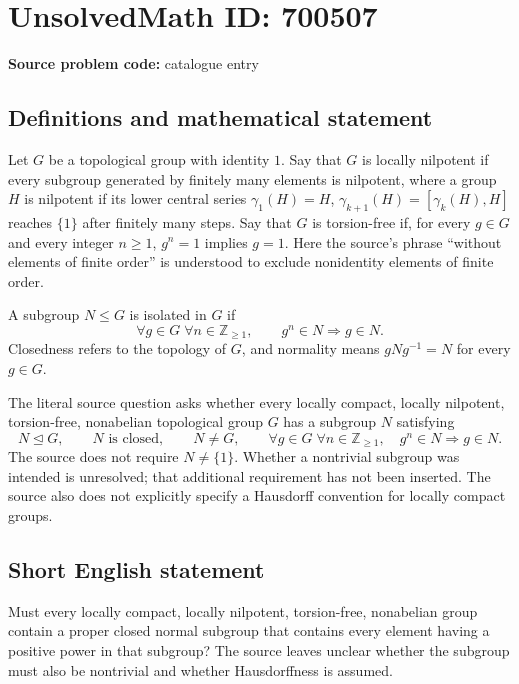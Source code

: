 \documentclass[11pt]{article}
\newcommand{\Z}{\mathbb{Z}}
\begin{document}
\section*{UnsolvedMath ID: 700507}
\textbf{Source problem code:} catalogue entry
\subsection{Definitions and mathematical statement}
Let \(G\) be a topological group with identity \(1\). Say that \(G\) is locally nilpotent if every subgroup generated by finitely many elements is nilpotent, where a group \(H\) is nilpotent if its lower central series \(\gamma_1(H)=H\), \(\gamma_{k+1}(H)=[\gamma_k(H),H]\) reaches \(\{1\}\) after finitely many steps. Say that \(G\) is torsion-free if, for every \(g\in G\) and every integer \(n\geq 1\), \(g^n=1\) implies \(g=1\). Here the source's phrase ``without elements of finite order'' is understood to exclude nonidentity elements of finite order.

A subgroup \(N\leq G\) is isolated in \(G\) if
\[
\forall g\in G\;\forall n\in\Z_{\geq 1},\qquad g^n\in N\Longrightarrow g\in N.
\]
Closedness refers to the topology of \(G\), and normality means \(gNg^{-1}=N\) for every \(g\in G\).

The literal source question asks whether every locally compact, locally nilpotent, torsion-free, nonabelian topological group \(G\) has a subgroup \(N\) satisfying
\[
N\trianglelefteq G,\qquad N\text{ is closed},\qquad N\neq G,\qquad
\forall g\in G\;\forall n\in\Z_{\geq 1},\quad g^n\in N\Longrightarrow g\in N.
\]
The source does not require \(N\neq\{1\}\). Whether a nontrivial subgroup was intended is unresolved; that additional requirement has not been inserted. The source also does not explicitly specify a Hausdorff convention for locally compact groups.
\subsection{Short English statement}
Must every locally compact, locally nilpotent, torsion-free, nonabelian group contain a proper closed normal subgroup that contains every element having a positive power in that subgroup? The source leaves unclear whether the subgroup must also be nontrivial and whether Hausdorffness is assumed.
\end{document}

